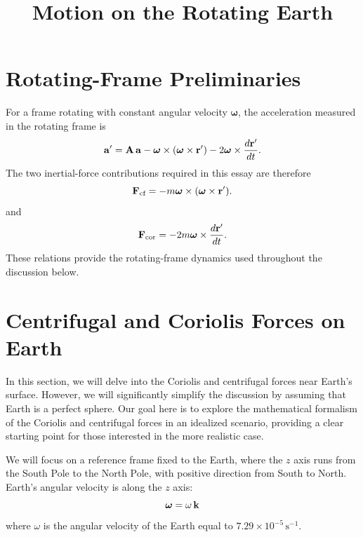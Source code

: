 \documentclass[12pt]{article}
\title{Motion on the Rotating Earth}
\author{}
\date{}
\begin{document}
\maketitle

\section{Rotating-Frame Preliminaries}

For a frame rotating with constant angular velocity $\boldsymbol{\omega}$, the acceleration
measured in the rotating frame is
\begin{equation}
  \vb{a}' = \vb{A}\,\vb{a}
    - \boldsymbol{\omega}\times(\boldsymbol{\omega}\times\vb{r}')
    - 2\boldsymbol{\omega}\times\frac{d\vb{r}'}{dt}.
  \label{earth:acceleration-transformation}
\end{equation}
The two inertial-force contributions required in this essay are therefore
\begin{equation}
  \vb{F}_\text{cf}
    = -m\boldsymbol{\omega}\times(\boldsymbol{\omega}\times\vb{r}').
  \label{earth:centrifugal-force-general}
\end{equation}
and
\begin{equation}
  \vb{F}_\text{cor}
    = -2m\boldsymbol{\omega}\times\frac{d\vb{r}'}{dt}.
  \label{earth:coriolis-force-general}
\end{equation}
These relations provide the rotating-frame dynamics used throughout the discussion below.

\section{Centrifugal and Coriolis Forces on Earth}

In this section, we will delve into the Coriolis and centrifugal forces near Earth's surface.
However, we will significantly simplify the discussion by assuming that Earth is a perfect
sphere. Our goal here is to explore the mathematical formalism of the Coriolis and centrifugal
forces in an idealized scenario, providing a clear starting point for those interested in the
more realistic case.

We will focus on a reference frame fixed to the Earth, where the $z$ axis runs from the South
Pole to the North Pole, with positive direction from South to North. Earth's angular velocity
is along the $z$ axis:
\begin{equation}
  \boldsymbol{\omega} = \omega\,\vb{k}
  \label{earth:angular-velocity}
\end{equation}
where $\omega$ is the angular velocity of the Earth equal to $7.29\times10^{-5}\,\text{s}^{-1}$.
\end{document}
